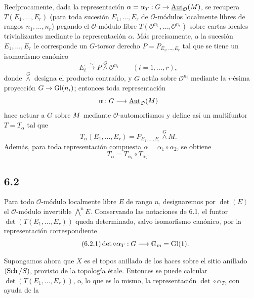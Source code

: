 Recíprocamente, dada la representación
\(\alpha=\alpha_T:G\to\underline{\Aut}_{\mathcal O}(M)\), se recupera
\(T(E_1,\ldots,E_r)\) (para toda sucesión \(E_1,\ldots,E_r\) de
\(\mathcal O\)-módulos localmente libres de rangos \(n_1,\ldots,n_r\))
pegando el \(\mathcal O\)-módulo libre
\(T(\mathcal O^{n_1},\ldots,\mathcal O^{n_r})\) sobre cartas locales
trivializantes mediante la representación \(\alpha\). Más precisamente, a
la sucesión \(E_1,\ldots,E_r\) le corresponde un \(G\)-torsor derecho
\(P=P_{E_1,\ldots,E_r}\) tal que se tiene un isomorfismo canónico
\begin{equation}\tag{6.1.3}
 E_i\xrightarrow{\sim}P\overset{G}{\wedge}\mathcal O^{n_i}\qquad(i=1,\ldots,r),
\end{equation}
donde \(\overset{G}{\wedge}\) designa el producto contraído, y \(G\) actúa
sobre \(\mathcal O^{n_i}\) mediante la \(i\)-ésima proyección
\(G\to\Gl(n_i)\); entonces toda representación
\[
 \alpha:G\longrightarrow\underline{\Aut}_{\mathcal O}(M)
\]
hace actuar a \(G\) sobre \(\sisi{\mathcal O^m}{M}\) mediante %
\(\mathcal O\)-automorfismos y define así un multifuntor \(T=T_\alpha\) tal
que
\begin{equation}\tag{6.1.4}
 T_\alpha(E_1,\ldots,E_r)=P_{E_1,\ldots,E_r}\overset{G}{\wedge} M.
\end{equation}
Además, para toda representación compuesta
\(\alpha=\alpha_1\circ\alpha_2\), se obtiene
\begin{equation}\tag{6.1.5}
 T_\alpha=T_{\alpha_1}\circ T_{\alpha_2}.
\end{equation}

\subsection*{6.2}
Para todo \(\mathcal O\)-módulo localmente libre \(E\) de rango \(n\),
designaremos por \(\det(E)\) el \(\mathcal O\)-módulo invertible
\(\bigwedge\limits^n E\). Conservando las notaciones de 6.1, el funtor
\(\det(T(E_1,\ldots,E_r))\) queda determinado, salvo isomorfismo canónico,
por la representación correspondiente
\begin{equation}\tag{6.2.1}
 \det\circ\alpha_T:G\longrightarrow\Gm=\Gl(1).
\end{equation}

Supongamos ahora que \(X\) es el topos anillado de los haces sobre el sitio
anillado \((\Sch/S)\), provisto de la topología étale. Entonces se puede
calcular \(\det(T(E_1,\ldots,E_r))\), o, lo que es lo mismo, la
representación \(\det\circ\alpha_T\), con ayuda de la

